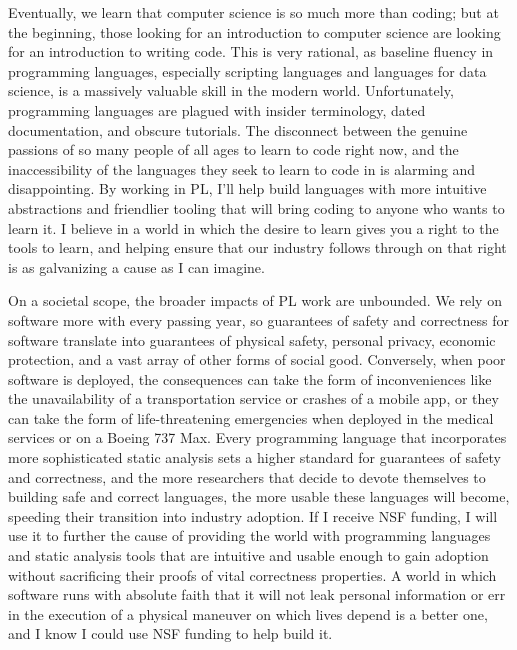 \documentclass{nsf-grfp}
\begin{document}
Eventually, we learn that computer science is so much more than coding; but at the beginning, those looking for an introduction to computer science are looking for an introduction to writing code. This is very rational, as baseline fluency in programming languages, especially scripting languages and languages for data science, is a massively valuable skill in the modern world. Unfortunately, programming languages are plagued with insider terminology, dated documentation, and obscure tutorials. The disconnect between the genuine passions of so many people of all ages to learn to code right now, and the inaccessibility of the languages they seek to learn to code in is alarming and disappointing. By working in PL, I'll help build languages with more intuitive abstractions and friendlier tooling that will bring coding to anyone who wants to learn it. I believe in a world in which the desire to learn gives you a right to the tools to learn, and helping ensure that our industry follows through on that right is as galvanizing a cause as I can imagine.

On a societal scope, the broader impacts of PL work are unbounded. We rely on software more with every passing year, so guarantees of safety and correctness for software translate into guarantees of physical safety, personal privacy, economic protection, and a vast array of other forms of social good. Conversely, when poor software is deployed, the consequences can take the form of inconveniences like the unavailability of a transportation service or crashes of a mobile app, or they can take the form of life-threatening emergencies when deployed in the medical services or on a Boeing 737 Max. Every programming language that incorporates more sophisticated static analysis sets a higher standard for guarantees of safety and correctness, and the more researchers that decide to devote themselves to building safe and correct languages, the more usable these languages will become, speeding their transition into industry adoption. If I receive NSF funding, I will use it to further the cause of providing the world with programming languages and static analysis tools that are intuitive and usable enough to gain adoption without sacrificing their proofs of vital correctness properties. A world in which software runs with absolute faith that it will not leak personal information or err in the execution of a physical maneuver on which lives depend is a better one, and I know I could use NSF funding to help build it. 
\end{document}
